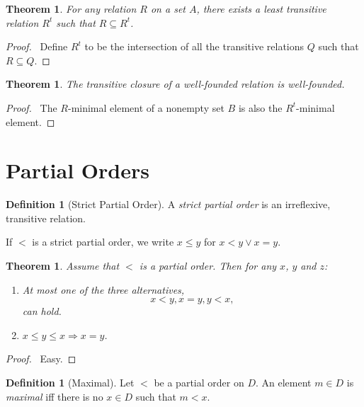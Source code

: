 \documentclass{article}
\let\qed\relax
\newtheorem{theorem}[axiom]{Theorem}
\theoremstyle{definition}
\newtheorem{definition}[axiom]{Definition}
\begin{document}
    \begin{theorem}
        \label{theorem:tc}
        For any relation $R$ on a set $A$, there exists a least transitive relation $R^t$ such that $R
        \subseteq R^t$.
    \end{theorem}

    \begin{proof}
        \pf\ Define $R^t$ to be the intersection of all the transitive relations $Q$ such that $R \subseteq Q$. \qed
    \end{proof}

    \begin{theorem}
        \label{theorem:tc_well_founded}
        The transitive closure of a well-founded relation is well-founded.
    \end{theorem}

    \begin{proof}
        \pf\ The $R$-minimal element of a nonempty set $B$ is also the $R^t$-minimal element. \qed
    \end{proof}

    \section{Partial Orders}

    \begin{definition}[Strict Partial Order]
        A \emph{strict partial order} is an irreflexive, transitive relation.

        If $<$ is a strict partial order, we write $x \leq y$ for $x < y \vee x = y$.
    \end{definition}

    \begin{theorem}
        Assume that $<$ is a partial order. Then for any $x$, $y$ and $z$:
        \begin{enumerate}
            \item \emph{At most} one of the three alternatives,
            \[ x < y, x = y, y < x, \]
            can hold.
            \item $x \leq y \leq x \Rightarrow x = y$.
        \end{enumerate}
    \end{theorem}

    \begin{proof}
        \pf\ Easy. \qed
    \end{proof}

    \begin{definition}[Maximal]
        Let $<$ be a partial order on $D$. An element $m \in D$ is \emph{maximal} iff there is no
        $x \in D$ such that $m < x$.
    \end{definition}
\end{document}
